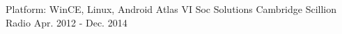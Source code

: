 \begin{cventries}
  \cventry
    {Platform: WinCE, Linux, Android} %
    {Atlas VI Soc Solutions} %
    {Cambridge Scillion Radio} %
    {Apr. 2012 - Dec. 2014} %
    {
      \begin{cvitems} %
        \item {}
        \item {}
        \item {}
		\item {}
        \item {}
        \item {}
      \end{cvitems}
    }

\end{cventries}
